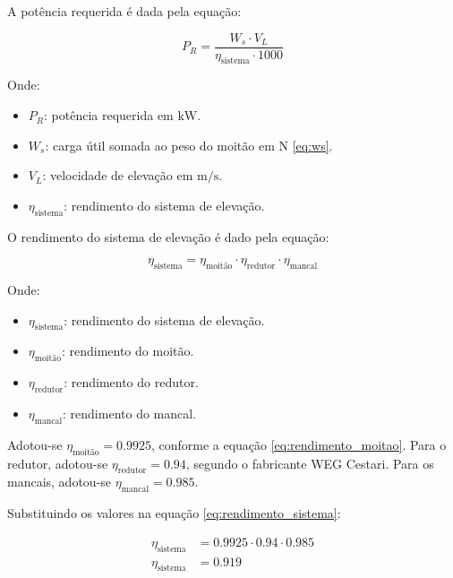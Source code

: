 ﻿A potência requerida é dada pela equação:

\begin{equation}
  P_R = \frac{W_s \cdot V_L}{\eta_{\text{sistema}} \cdot 1000}
  \label{eq:potencia_requerida}
\end{equation}

Onde:

\begin{itemize}[leftmargin=1.25cm]
  \item $P_R$: potência requerida em $\si{\kilo\watt}$.
  \item $W_s$: carga útil somada ao peso do moitão em $\si{\newton}$ \eqref{eq:ws}.
  \item $V_L$: velocidade de elevação em $\si{\meter\per\second}$.
  \item $\eta_{\text{sistema}}$: rendimento do sistema de elevação.
\end{itemize}

\vspace{1em}

O rendimento do sistema de elevação é dado pela equação:

\begin{equation}
  \eta_{\text{sistema}} = \eta_{\text{moitão}} \cdot \eta_{\text{redutor}} \cdot \eta_{\text{mancal}}
  \label{eq:rendimento_sistema}
\end{equation}

Onde:

\begin{itemize}[leftmargin=1.25cm]
  \item $\eta_{\text{sistema}}$: rendimento do sistema de elevação.
  \item $\eta_{\text{moitão}}$: rendimento do moitão.
  \item $\eta_{\text{redutor}}$: rendimento do redutor.
  \item $\eta_{\text{mancal}}$: rendimento do mancal.
\end{itemize}

\vspace{1em}

Adotou-se $\eta_{\text{moitão}} = \num{0.9925}$, conforme a equação \eqref{eq:rendimento_moitao}. Para o redutor, adotou-se $\eta_{\text{redutor}} = \num{0.94}$, segundo o fabricante WEG Cestari. Para os mancais, adotou-se $\eta_{\text{mancal}} = \num{0.985}$.

Substituindo os valores na equação \eqref{eq:rendimento_sistema}:

\begin{align*}
  \eta_{\text{sistema}} & = \num{0.9925} \cdot \num{0.94} \cdot \num{0.985} \\
  \eta_{\text{sistema}} & = \boxed{\num{0.919}}
\end{align*}

